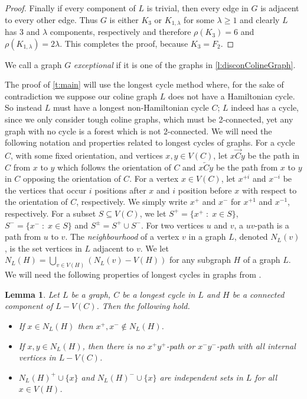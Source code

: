 \documentclass[12pt]{article}
\newtheorem{lem}[thm]{Lemma}
\theoremstyle{definition}
\newcommand{\ola}{\overleftarrow{C}}
\newcommand{\ora}{\overrightarrow{C}}
\begin{document}
\begin{proof}
Finally if every component of $L$ is trivial, then every edge in $G$ is adjacent to every other edge. Thus $G$ is either $K_3$ or $K_{1,\lambda}$ for some $\lambda\geq 1$ and clearly $L$ has $3$ and $\lambda$ components, respectively and therefore $\rho(K_3)=6$ and $\rho(K_{1,\lambda})=2\lambda$. This completes the proof, because $K_3 = F_2$.
\end{proof}
\noindent 
We call a graph $G$ \emph{exceptional} if it is one of the graphs in \cref{l:disconColineGraph}.

The proof of \cref{t:main} will use the longest cycle method where, for the sake of contradiction we suppose our coline graph $L$ does not have a Hamiltonian cycle. So 
instead $L$ must have a longest non-Hamiltonian cycle $C$; $L$ indeed has a cycle, 
since we only consider tough coline graphs, which must be 2-connected, yet any graph with no cycle is a forest which is not $2$-connected.
We will need the following notation and properties related to longest cycles of graphs.
For a cycle $C$, with some fixed orientation, and vertices $x,y \in V(C)$, let $x \ora y$ be the path in $C$ from $x$ to $y$ which follows the orientation of $C$ and $x \ola y$ be the path from $x$ to $y$ in $C$ opposing the orientation of $C$.
For a vertex $x \in V(C)$, let $x^{+i}$ and $x^{-i}$ be the vertices that occur $i$ positions after $x$ and $i$ position before $x$ with respect to the orientation of $C$, respectively. We simply write $x^+$ and $x^-$ for $x^{+1}$ and $x^{-1}$, respectively. For a subset $S \subseteq V(C)$, we let $S^+ = \{x^+\;:\; x \in S\}$, $S^- = \{x^-\;:\; x \in S\}$ and $S^\pm = S^+\cup S^-$.
For two vertices $u$ and $v$, a $uv$-path is a path from $u$ to $v$.
The {\em neighbourhood} of a vertex $v$ in a graph $L$, denoted $N_L(v)$, is the set vertices in $L$ adjacent to $v$. We let $N_L(H)=\bigcup_{v \in V(H)} \left(N_L(v)- V(H)\right) $ for any subgraph $H$ of a graph $L$.
We will need the following properties of longest cycles in graphs from \cite{OtSa24}.
\begin{lem}\label{l:propsOfLongestCycle}
Let $L$ be a graph, $C$ be a longest cycle in $L$ and $H$ be a connected component of $L-V(C)$. Then the following hold.
\begin{itemize}
\item[(i)] If $x \in N_L(H)$ then $x^+,x^- \notin N_L(H)$.
\item[(ii)] If $x,y \in N_L(H)$, then there is no $x^+y^+$-path or  $x^-y^-$-path with all internal vertices in $L-V(C)$.
\item[(iii)] $N_L(H)^+\cup\{x\}$ and $N_L(H)^-\cup\{x\}$ are independent sets in $L$ for all $x \in V(H)$.
\end{itemize}
\end{lem}
\end{document}
